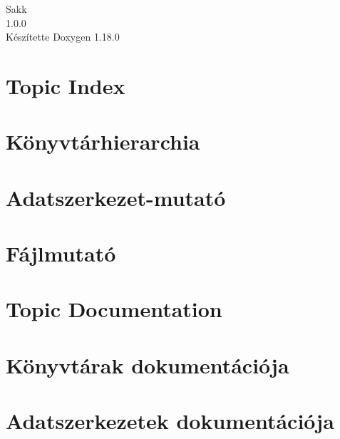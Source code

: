 \documentclass[twoside]{book}
\newcommand{\+}{\discretionary{\mbox{\scriptsize$\hookleftarrow$}}{}{}}
\newcommand{\clearemptydoublepage}{%
    \newpage{\pagestyle{empty}\cleardoublepage}%
  }
\begin{document}
  \raggedbottom
    \hypersetup{pageanchor=false,
                bookmarksnumbered=true,
                pdfencoding=unicode
               }
  \begin{titlepage}
  \vspace*{7cm}
  \begin{center}%
  {\Large Sakk}\\
  [1ex]\large 1.\+0.\+0 \\
  \vspace*{1cm}
  {\large Készítette Doxygen 1.18.0}\\
  \end{center}
  \end{titlepage}
  \clearemptydoublepage
  \tableofcontents
  \clearemptydoublepage
  \hypersetup{pageanchor=true}

\chapter{Topic Index}

\chapter{Könyvtárhierarchia}

\chapter{Adatszerkezet-\/mutató}

\chapter{Fájlmutató}

\chapter{Topic Documentation}






\chapter{Könyvtárak dokumentációja}


\chapter{Adatszerkezetek dokumentációja}





\end{document}
